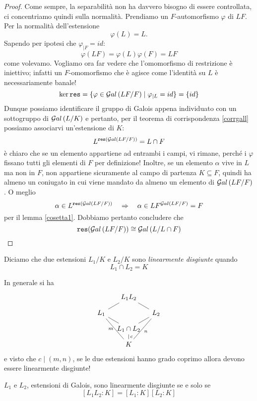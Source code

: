 \begin{multicols}{2}
	\begin{proof}
		Come sempre, la separabilità non ha davvero bisogno di essere controllata, ci concentriamo quindi sulla normalità. Prendiamo un $ F $-automorfismo $ \varphi $ di $ LF $. Per la normalità dell'estensione $$  \varphi(L) = L.  $$ Sapendo per ipotesi che $ \varphi_{|F} = id $: 
		\[ \varphi(LF) = \varphi(L)\varphi(F) = LF \]
		come volevamo. Vogliamo ora far vedere che l'omomorfismo di restrizione
		è iniettivo; infatti un $ F $-omomorfismo che è agisce come l'identità su $ L $ è necessariamente banale!
		\[ \ker \texttt{res} = \{ \varphi \in \mathcal{G}al\left( LF/F \right) \mid \varphi_{|L} = id \} = \{ id \} \]
		Dunque possiamo identificare il gruppo di Galois appena individuato con un sottogruppo di $ \mathcal{G}al\left( L/K \right) $ e pertanto, per il teorema di corrispondenza \ref{corrgall} possiamo associarvi un'estensione di $ K $:
		\[ L^{\texttt{res}(\mathcal{G}al\left( LF/F \right))} = L \cap F \]
		è chiaro che se un elemento appartiene ad entrambi i campi, vi rimane, perché i $ \varphi $ fissano tutti gli elementi di $ F $ per definizione! Inoltre, se un elemento $ \alpha $ vive in $ L $ ma non in $ F $, non appartiene sicuramente al campo di partenza $ K \subseteq F $, quindi ha almeno un coniugato in cui viene mandato da almeno un elemento di $ \mathcal{G}al\left( LF/F \right) $. O meglio
		\[ \alpha \in L^{\texttt{res}(\mathcal{G}al\left( LF/F \right))} \quad\Rightarrow\quad \alpha \in LF^{\mathcal{G}al\left( LF/F \right)} = F \]
		per il lemma \ref{cosetta1}. Dobbiamo pertanto concludere che
		\[ \texttt{res}(\mathcal{G}al\left( LF/F \right)) \cong \mathcal{G}al\left( L/L\cap F \right) \]
	\end{proof}
	
	\begin{definition}
		Diciamo che due estensioni $ L_1/K $ e $ L_2/K $ sono \emph{linearmente disgiunte} quando
		\[ L_1 \cap L_2 = K \]
	\end{definition}

	\begin{remark}
		In generale si ha
		\[\begin{tikzcd}[row sep=0.25cm, column sep=0.3cm]
		& L_1L_2 \arrow[dl,-] \arrow[dr,-] &  \\
		L_1 \arrow[ddr,-, "m" left] \arrow[dr,-] &  & L_2 \arrow [ddl,-, "n"] \\
		& L_1\cap L_2 \arrow[ur,-] \arrow[d,-, "c"]  & \\
		& K &
		\end{tikzcd} \]
		e visto che $ c \mid (m, n) $, se le due estensioni hanno grado coprimo allora devono essere linearmente disgiunte!
	\end{remark}
	\begin{remark}
		$ L_1 $ e $ L_2 $, estensioni di Galois, sono linearmente disgiunte se e solo se \[ [L_1L_2: K] = [L_1: K][L_2: K] \]
	\end{remark}
	

\end{multicols}
